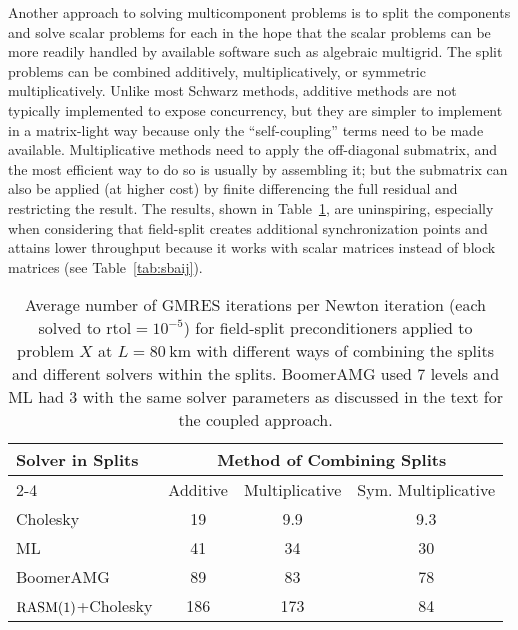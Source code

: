 Another approach to solving multicomponent problems is to split the components and solve scalar problems for each in the hope that the scalar problems can be more readily handled by available software such as algebraic multigrid.  The split problems can be combined additively, multiplicatively, or symmetric multiplicatively.  Unlike most Schwarz methods, additive methods are not typically implemented to expose concurrency, but they are simpler to implement in a matrix-light way because only the ``self-coupling'' terms need to be made available.  Multiplicative methods need to apply the off-diagonal submatrix, and the most efficient way to do so is usually by assembling it; but the submatrix can also be applied (at higher cost) by finite differencing the full residual and restricting the result.  The results, shown in Table~\ref{tab:fieldsplit}, are uninspiring, especially when considering that field-split creates additional synchronization points and attains lower throughput because it works with scalar matrices instead of block matrices (see Table~\ref{tab:sbaij}).

\begin{table}
  \centering\caption{Average number of GMRES iterations per Newton iteration (each solved to $\mathrm{rtol} = 10^{-5}$) for field-split preconditioners applied to problem $X$ at $L = \SI{80}{\kilo\metre}$ with different ways of combining the splits and different solvers within the splits.
BoomerAMG used 7 levels and ML had 3 with the same solver parameters as discussed in the text for the coupled approach.}\label{tab:fieldsplit}
  \begin{tabular}{lccc}
    \toprule
    \multirow{3}{*}{Solver in Splits} & \multicolumn{3}{c}{Method of Combining Splits} \\
    \cmidrule{2-4}
     & Additive & Multiplicative & Sym. Multiplicative \\
    \midrule
    Cholesky            & 19       & 9.9            & 9.3                 \\
    ML                  & 41       & 34             & 30                  \\
    BoomerAMG           & 89       & 83             & 78                  \\
    $\mathrm{RASM}(1)$+Cholesky & 186      & 173            & 84                  \\
    \bottomrule
  \end{tabular}
\end{table}

